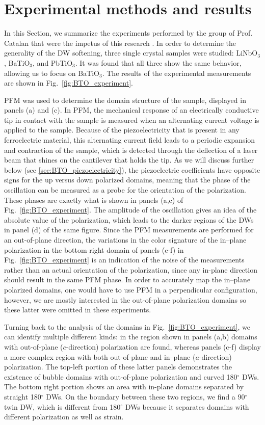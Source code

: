 \section{Experimental methods and results \label{sec:BTO_exp}}
In this Section, we summarize the experiments performed by the group of Prof. Catalan that were the impetus of this research \cite{Stefani2020}.
In order to determine the generality of the \gls{DW} softening, three single crystal samples were studied: LiNbO$_3$, BaTiO$_3$, and PbTiO$_3$. It was found that all three show the same behavior, allowing us to focus on BaTiO$_3$.
The results of the experimental measurements are shown in Fig.~\ref{fig:BTO_experiment}.

\Gls{PFM} \cite{Harnagea2001} was used to determine the domain structure of the sample, displayed in panels (a) and (c).
In \gls{PFM}, the mechanical response of an electrically conductive tip in contact with the sample is measured when an alternating current voltage is applied to the sample.
Because of the piezoelectricity that is present in any ferroelectric material, this alternating current field leads to a periodic expansion and contraction of the sample, which is detected through the deflection of a laser beam that shines on the cantilever that holds the tip.
As we will discuss further below (see \ref{sec:BTO_piezoelectricity}), the piezoelectric coefficients have opposite signs for the up versus down polarized domains, meaning that the phase of the oscillation can be measured as a probe for the orientation of the polarization.
These phases are exactly what is shown in panels (a,c) of Fig.~\ref{fig:BTO_experiment}. The amplitude of the oscillation gives an idea of the absolute value of the polarization, which leads to the darker regions of the \glspl{DW} in panel (d) of the same figure.
Since the \gls{PFM} measurements are performed for an out-of-plane direction, the variations in the color signature of the in--plane polarization in the bottom right domain of panels (c-f) in Fig.~\ref{fig:BTO_experiment} is an indication of the noise of the measurements rather than an actual orientation of the polarization, since any in-plane direction should result in the same \gls{PFM} phase.
In order to accurately map the in--plane polarized domains, one would have to use \gls{PFM} in a perpendicular configuration, however, we are mostly interested in the out-of-plane polarization domains so these latter were omitted in these experiments.

Turning back to the analysis of the domains in Fig.~\ref{fig:BTO_experiment}, we can identify multiple different kinds: in the region shown in panels (a,b) domains with out-of-plane ($c$-direction) polarization are found, whereas panels (c-f) display a more complex region with both out-of-plane and in--plane ($a$-direction) polarization.
The top-left portion of these latter panels demonstrates the existence of bubble domains with out-of-plane polarization and curved 180$^\circ$ \glspl{DW}.
The bottom right portion shows an area with in-plane domains separated by straight 180$^\circ$ \glspl{DW}.
On the boundary between these two regions, we find a 90$^\circ$ twin \gls{DW}, which is different from 180$^\circ$ \glspl{DW} because it separates domains with different polarization as well as strain.

